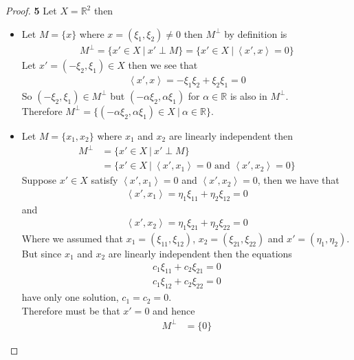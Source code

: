 \documentclass[11pt]{article}
\newcommand{\R}{\mathbb{R}}
\newcommand{\inprd}[1]{\left\langle{#1}\right\rangle}
\theoremstyle{definition}
\begin{document}
\cleardoublepage
\begin{proof}{\textbf{5}}
Let $X = \R^2$ then
\begin{itemize}
\item[(a)] Let $M = \{x\}$ where $x = (\xi_1, \xi_2) \neq 0$ then $M^\perp$ by
definition is 
\begin{align*}
    M^\perp = \{x'\in X~|~x'\perp M\} = \{x'\in X~|~\inprd{x',x} = 0\}
\end{align*}
Let $x' = (-\xi_2, \xi_1) \in X$ then we see that
\begin{align*}
    \inprd{x',x} = -\xi_1 \xi_2 + \xi_2 \xi_1 = 0
\end{align*}
So $(-\xi_2, \xi_1) \in M^\perp$ but $(-\alpha\xi_2, \alpha\xi_1)$ for
$\alpha \in \R$ is also in $M^\perp$.
\\
Therefore $M^\perp = \{(-\alpha\xi_2,\alpha\xi_1) \in X ~|~ \alpha \in \R\}$.
\item[(b)] Let $M = \{x_1, x_2\}$ where $x_1$ and $x_2$ are linearly
independent then
\begin{align*}
    M^\perp &= \{x'\in X~|~x'\perp M\}\\
    &= \{x'\in X~|~\inprd{x',x_1} = 0 \text{ and } \inprd{x',x_2} = 0\}
\end{align*}
Suppose $x' \in X$ satisfy $\inprd{x',x_1} = 0$ and $\inprd{x',x_2} = 0$,
then we have that
\begin{align*}
    \inprd{x',x_1} = \eta_1\xi_{11} + \eta_2\xi_{12} = 0
\end{align*}
and 
\begin{align*}
    \inprd{x',x_2} = \eta_1\xi_{21} + \eta_2\xi_{22} = 0
\end{align*}
Where we assumed that $x_1 = (\xi_{11}, \xi_{12})$, $x_2 = (\xi_{21}, \xi_{22})$
and $x' = (\eta_{1}, \eta_{2})$.
But since $x_1$ and $x_2$ are linearly independent then the equations
\begin{align*}
    c_{1}\xi_{11} + c_2\xi_{21} = 0\\
    c_{1}\xi_{12} + c_2\xi_{22} = 0
\end{align*}
have only one solution, $c_1 = c_2 = 0$.
\\
Therefore must be that $x' = 0$ and hence
\begin{align*}
    M^\perp &= \{0\}
\end{align*}
\end{itemize}
\end{proof}
\end{document}
